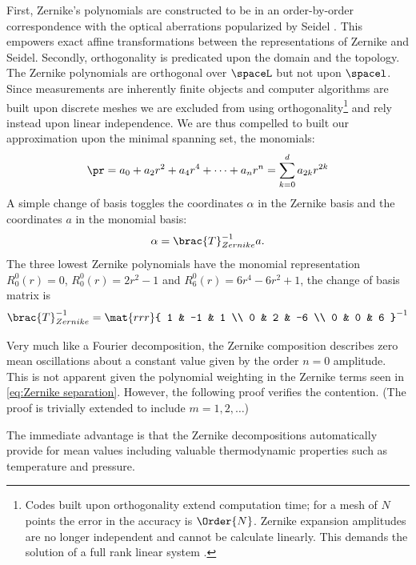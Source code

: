 \documentclass[final,leqno,onefignum,onetabnum]{siamltex1213}
\begin{document}
First, Zernike's polynomials are constructed to be in an order-by-order correspondence with the optical aberrations popularized by Seidel \cite{Zernike}. This empowers exact affine transformations between the representations of Zernike and Seidel. Secondly, orthogonality is predicated upon the domain and the topology. The Zernike polynomials are orthogonal over $\spaceL$ but not upon $\spacel$. Since measurements are inherently finite objects and computer algorithms are built upon discrete meshes we are excluded from using orthogonality\footnote{Codes built upon orthogonality extend computation time; for a mesh of $N$ points the error in the accuracy is $\Order{N}$. Zernike expansion amplitudes are no longer independent and cannot be calculate linearly. This demands the solution of a full rank linear system  \cite{Topa orthogonality}.} and rely instead upon linear independence. We are thus compelled to built our approximation upon the minimal spanning set, the monomials:
%
\begin{equation}
  \pr = a_{0} + a_{2}r^{2} + a_{4}r^{4} + \dots + a_{n}r^{n} = \sum_{k=0}^{d} a_{2k}r^{2k}
  \label{eq:even polynomials}
\end{equation}
%
A simple change of basis toggles the coordinates $\alpha$ in the Zernike basis and the coordinates $a$ in the monomial basis:
\begin{equation}
  \alpha = \brac{T}_{Zernike}^{-1} a.
\end{equation}
The three lowest Zernike polynomials have the monomial representation $R_{0}^{0}(r) = 0$, $R_{0}^{0}(r) = 2r^{2} - 1$ and  $R_{6}^{0}(r) = 6r^{4} - 6r^{2} + 1$, the change of basis matrix is
\begin{equation}
  \brac{T}_{Zernike}^{-1} = \mat{rrr}{
  1 & -1 &  1 \\
  0 &  2 & -6 \\
  0 &  0 &  6 }^{-1}
\end{equation}

Very much like a Fourier decomposition, the Zernike composition describes zero mean oscillations about a constant value given by the order $n=0$ amplitude. This is not apparent given the polynomial weighting in the Zernike terms seen in \eqref{eq:Zernike separation}. However, the following proof verifies the contention. (The proof is trivially extended to include $m=1,2,\dots$)


The immediate advantage is that the Zernike decompositions automatically provide for mean values including valuable thermodynamic properties such as temperature and pressure.
\end{document}

